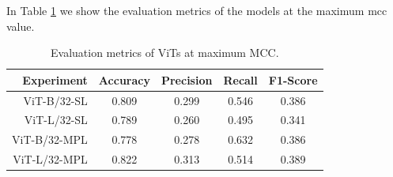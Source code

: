 In Table \ref{tab:mcc_metrics} we show the evaluation metrics of the models at 
the maximum \acs{mcc} value.

\begin{table}[h]
    \vspace{0.3cm}
    \centering
    \begin{tabular}{rcccc}
    \hline
    \textbf{Experiment} & \textbf{Accuracy} & \textbf{Precision} & \textbf{Recall} & \textbf{F1-Score} \\ \hline\hline
    ViT-B/32-SL & 0.809 & 0.299 & 0.546 & 0.386 \\\hline
    ViT-L/32-SL & 0.789 & 0.260 & 0.495 & 0.341 \\\hline
    ViT-B/32-MPL & 0.778 & 0.278 & 0.632 & 0.386 \\\hline
    ViT-L/32-MPL & 0.822 & 0.313 & 0.514 & 0.389 \\\hline
    \end{tabular}
    \caption[Evaluation metrics of ViTs at maximum MCC.]
    {Evaluation metrics of ViTs at maximum MCC.}
    \label{tab:mcc_metrics}
\end{table}

